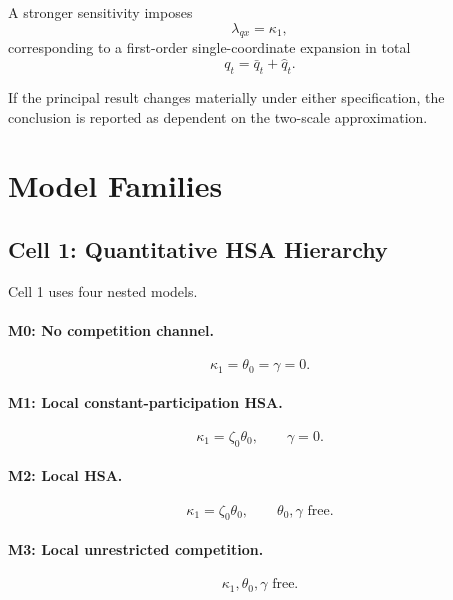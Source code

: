 \documentclass[11pt]{article}
\begin{document}
A stronger sensitivity imposes
\begin{equation}
\lambda_{qx}=\kappa_1,
\end{equation}
corresponding to a first-order single-coordinate expansion in total
\begin{equation}
q_t=\bar q_t+\hat q_t.
\end{equation}

If the principal result changes materially under either specification, the conclusion is reported as dependent on the two-scale approximation.

\section{Model Families}

\subsection{Cell 1: Quantitative HSA Hierarchy}

Cell 1 uses four nested models.

\paragraph{M0: No competition channel.}
\begin{equation}
\kappa_1=\theta_0=\gamma=0.
\end{equation}

\paragraph{M1: Local constant-participation HSA.}
\begin{equation}
\kappa_1=\zeta_0\theta_0,
\qquad
\gamma=0.
\end{equation}

\paragraph{M2: Local HSA.}
\begin{equation}
\kappa_1=\zeta_0\theta_0,
\qquad
\theta_0,\gamma\text{ free}.
\end{equation}

\paragraph{M3: Local unrestricted competition.}
\begin{equation}
\kappa_1,\theta_0,\gamma
\text{ free}.
\end{equation}
\end{document}
